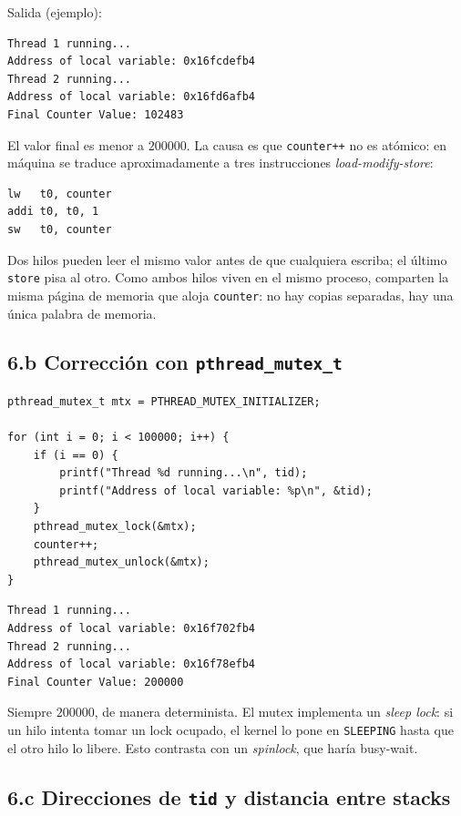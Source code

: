 \documentclass[11pt,a4paper]{article}
\begin{document}
Salida (ejemplo):

\begin{lstlisting}[style=textstyle]
Thread 1 running...
Address of local variable: 0x16fcdefb4
Thread 2 running...
Address of local variable: 0x16fd6afb4
Final Counter Value: 102483
\end{lstlisting}

El valor final es menor a $200000$. La causa es que \texttt{counter++}
no es atómico: en máquina se traduce aproximadamente a tres instrucciones
\emph{load-modify-store}:

\begin{lstlisting}[style=textstyle]
lw   t0, counter
addi t0, t0, 1
sw   t0, counter
\end{lstlisting}

Dos hilos pueden leer el mismo valor antes de que cualquiera escriba; el
último \texttt{store} pisa al otro. Como ambos hilos viven en el mismo
proceso, comparten la misma página de memoria que aloja \texttt{counter}:
no hay copias separadas, hay una única palabra de memoria.

\subsection*{6.b Corrección con \texttt{pthread\_mutex\_t}}

\begin{lstlisting}[style=cstyle]
pthread_mutex_t mtx = PTHREAD_MUTEX_INITIALIZER;

for (int i = 0; i < 100000; i++) {
    if (i == 0) {
        printf("Thread %d running...\n", tid);
        printf("Address of local variable: %p\n", &tid);
    }
    pthread_mutex_lock(&mtx);
    counter++;
    pthread_mutex_unlock(&mtx);
}
\end{lstlisting}

\begin{lstlisting}[style=textstyle]
Thread 1 running...
Address of local variable: 0x16f702fb4
Thread 2 running...
Address of local variable: 0x16f78efb4
Final Counter Value: 200000
\end{lstlisting}

Siempre $200000$, de manera determinista. El mutex implementa un
\emph{sleep lock}: si un hilo intenta tomar un lock ocupado, el kernel
lo pone en \texttt{SLEEPING} hasta que el otro hilo lo libere. Esto
contrasta con un \emph{spinlock}, que haría busy-wait.

\subsection*{6.c Direcciones de \texttt{tid} y distancia entre stacks}
\end{document}
